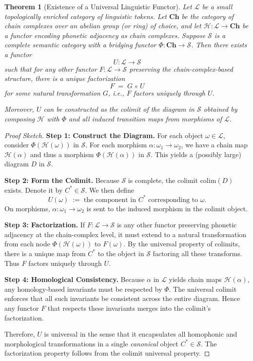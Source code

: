 \documentclass[11pt]{article}
\newtheorem{theorem}{Theorem}[section]
\theoremstyle{definition}
\theoremstyle{remark}
\begin{document}
\begin{theorem}[Existence of a Universal Linguistic Functor]
\label{thm:universal-ling-func}
Let \(\mathcal{L}\) be a small topologically enriched category of linguistic tokens. Let \(\mathbf{Ch}\) be the category of chain complexes over an abelian group (or ring) of choice, and let \(\mathcal{H}: \mathcal{L} \to \mathbf{Ch}\) be a functor encoding phonetic adjacency as chain complexes. Suppose \(\mathcal{S}\) is a complete semantic category with a bridging functor \(\Phi: \mathbf{Ch}\to \mathcal{S}\). Then there exists a functor
\[
U: \mathcal{L} \longrightarrow \mathcal{S}
\]
such that for any other functor \(F: \mathcal{L}\to\mathcal{S}\) preserving the chain-complex-based structure, there is a unique factorization
\[
F \;=\; G \,\circ\, U
\]
for some natural transformation \(G\), i.e., \(F\) factors uniquely through \(U\).

Moreover, \(U\) can be constructed as the colimit of the diagram in \(\mathcal{S}\) obtained by composing \(\mathcal{H}\) with \(\Phi\) and all induced transition maps from morphisms of \(\mathcal{L}\).
\end{theorem}

\begin{proof}[Proof Sketch]
\textbf{Step 1: Construct the Diagram.}  
For each object \(\omega\in \mathcal{L}\), consider \(\Phi(\mathcal{H}(\omega))\) in \(\mathcal{S}\). For each morphism \(\alpha:\omega_1 \to \omega_2\), we have a chain map \(\mathcal{H}(\alpha)\) and thus a morphism \(\Phi(\mathcal{H}(\alpha))\) in \(\mathcal{S}\). This yields a (possibly large) diagram \(D\) in \(\mathcal{S}\).

\textbf{Step 2: Form the Colimit.}  
Because \(\mathcal{S}\) is complete, the colimit \(\mathrm{colim}(D)\) exists. Denote it by \(C^*\in \mathcal{S}\). We then define
\[
U(\omega) \;:=\; \text{the component in } C^* \text{ corresponding to } \omega.
\]
On morphisms, \(\alpha:\omega_1\to \omega_2\) is sent to the induced morphism in the colimit object.

\textbf{Step 3: Factorization.}  
If \(F:\mathcal{L}\to\mathcal{S}\) is any other functor preserving phonetic adjacency at the chain-complex level, it must extend to a natural transformation from each node \(\Phi(\mathcal{H}(\omega))\) to \(F(\omega)\). By the universal property of colimits, there is a unique map from \(C^*\) to the object in \(\mathcal{S}\) factoring all these transforms. Thus \(F\) factors uniquely through \(U\).

\textbf{Step 4: Homological Consistency.}  
Because \(\alpha\) in \(\mathcal{L}\) yields chain maps \(\mathcal{H}(\alpha)\), any homology-based invariants must be respected by \(\Phi\). The universal colimit enforces that all such invariants be consistent across the entire diagram. Hence any functor \(F\) that respects these invariants merges into the colimit’s factorization.

Therefore, \(U\) is universal in the sense that it encapsulates all homophonic and morphological transformations in a single \emph{canonical} object \(C^*\in \mathcal{S}\). The factorization property follows from the colimit universal property. 
\end{proof}
\end{document}
